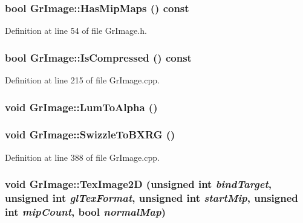 \begin{CompactItemize}
{\subsubsection[{HasMipMaps}]{\setlength{\rightskip}{0pt plus 5cm}bool GrImage::HasMipMaps () const}}
\label{class_gr_image_af38daff1672308197b7155c1d4fb2e3}




Definition at line 54 of file GrImage.h.\hypertarget{class_gr_image_f56a1347e57f10348427f26a873e6626}{
\subsubsection[{IsCompressed}]{\setlength{\rightskip}{0pt plus 5cm}bool GrImage::IsCompressed () const}}
\label{class_gr_image_f56a1347e57f10348427f26a873e6626}




Definition at line 215 of file GrImage.cpp.\hypertarget{class_gr_image_505dfff967ff222a0bfac1bc24e4c6bd}{
\subsubsection[{LumToAlpha}]{\setlength{\rightskip}{0pt plus 5cm}void GrImage::LumToAlpha ()}}
\label{class_gr_image_505dfff967ff222a0bfac1bc24e4c6bd}


\hypertarget{class_gr_image_65b8e5612f49397249c0d502ac451712}{
\subsubsection[{SwizzleToBXRG}]{\setlength{\rightskip}{0pt plus 5cm}void GrImage::SwizzleToBXRG ()}}
\label{class_gr_image_65b8e5612f49397249c0d502ac451712}




Definition at line 388 of file GrImage.cpp.\hypertarget{class_gr_image_e405a9f4a875593784f7282a290c69ab}{
\subsubsection[{TexImage2D}]{\setlength{\rightskip}{0pt plus 5cm}void GrImage::TexImage2D (unsigned int {\em bindTarget}, \/  unsigned int {\em glTexFormat}, \/  unsigned int {\em startMip}, \/  unsigned int {\em mipCount}, \/  bool {\em normalMap})}}
\label{class_gr_image_e405a9f4a875593784f7282a290c69ab}





\end{CompactItemize}
